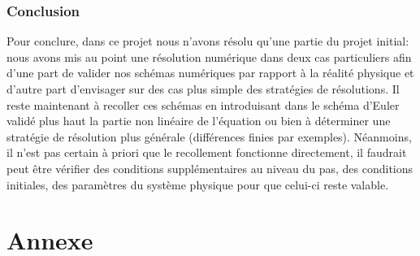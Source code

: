 \documentclass[10pt,a4paper]{article}
\begin{document}
\section{Conclusion}
Pour conclure, dans ce projet nous n'avons résolu qu'une partie du projet initial: nous avons mis au point une résolution numérique dans deux cas particuliers afin d'une part de valider nos schémas numériques par rapport à la réalité physique et d'autre part d'envisager sur des cas plus simple des stratégies de résolutions. Il reste maintenant à recoller ces schémas en introduisant dans le schéma d'Euler validé plus haut la partie non linéaire de l'équation ou bien à déterminer une stratégie de résolution plus générale (différences finies par exemples). Néanmoins, il n'est pas certain à priori que le recollement fonctionne directement, il faudrait peut être vérifier des conditions supplémentaires au niveau du pas, des conditions initiales, des paramètres du système physique pour que celui-ci reste valable.


\part*{Annexe}
\end{document}
